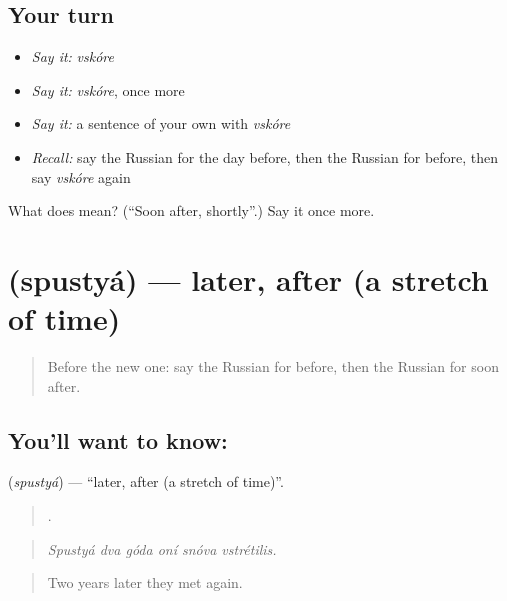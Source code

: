 \subsection*{Your turn}
\begin{itemize}
\raggedright
  \item \emph{Say it:} \emph{vskóre}
  \item \emph{Say it:} \emph{vskóre}, once more
  \item \emph{Say it:} a sentence of your own with \emph{vskóre}
  \item \emph{Recall:} say the Russian for the day before, then the Russian for before, then say \emph{vskóre} again
\end{itemize}

\begin{tcolorbox}[breakable,colback=teal!4,colframe=teal!35!black,title={Before you move on}]
What does  mean? (\textquotedblleft{}Soon after, shortly\textquotedblright{}.) Say it once more.
\end{tcolorbox}
\section[\texorpdfstring{\ru{спустя} (spustyá)}{спустя (spustyá)}]{ (spustyá) — later, after (a stretch of time)}

\label{lesson:RU-C272-spustya}



\begin{quote}
Before the new one: say the Russian for before, then the Russian for soon after.
\end{quote}

\subsection*{You'll want to know: }
\textbf{} (\emph{spustyá}) — \textquotedblleft{}later, after (a stretch of time)\textquotedblright{}.

\begin{quote}
     .
\end{quote}

\begin{quote}
\emph{Spustyá dva góda oní snóva vstrétilis.}
\end{quote}

\begin{quote}
Two years later they met again.
\end{quote}

